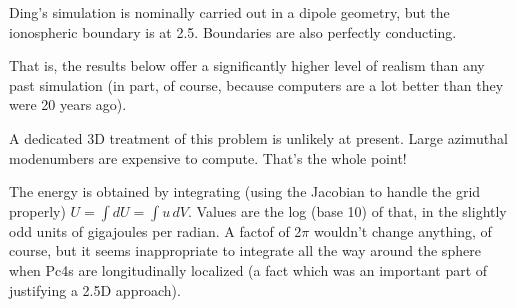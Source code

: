 Ding's simulation is nominally carried out in a dipole geometry, but the ionospheric boundary is at \SI{2.5}{\RE}. Boundaries are also perfectly conducting. 

That is, the results below offer a significantly higher level of realism than any past simulation (in part, of course, because computers are a lot better than they were 20 years ago). 

A dedicated 3D treatment of this problem is unlikely at present. Large azimuthal modenumbers are expensive to compute. That's the whole point! 




The energy is obtained by integrating (using the Jacobian to handle the grid properly) $U = \int dU = \int u \, dV$. Values are the log (base 10) of that, in the slightly odd units of gigajoules per radian. A factof of 2$\pi$ wouldn't change anything, of course, but it seems inappropriate to integrate all the way around the sphere when Pc4s are longitudinally localized (a fact which was an important part of justifying a 2.5D approach). 

